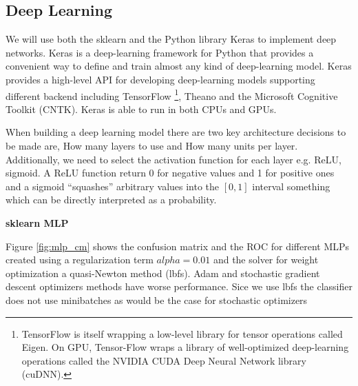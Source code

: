 \documentclass[11pt]{article}
\begin{document}


\subsection{Deep Learning}
\label{sse:resdeep}

We will use both the sklearn and the Python library Keras to implement deep networks. Keras is a deep-learning framework for Python that provides a convenient way to define and train almost any kind of deep-learning model. 
Keras provides a high-level API for developing deep-learning models supporting different backend including TensorFlow \footnote{TensorFlow is itself wrapping a low-level library for tensor operations called Eigen. On GPU, Tensor-Flow wraps a library of well-optimized deep-learning operations called the NVIDIA CUDA Deep Neural Network library (cuDNN).}, Theano and the Microsoft Cognitive Toolkit (CNTK). Keras is able to run in both CPUs and GPUs. 

When building a deep learning model there are two key architecture decisions to be made are, How many layers to use and How many units per layer. Additionally, we need to select the activation function for each layer e.g. ReLU, sigmoid. A ReLU function return 0 for negative values and 1 for positive ones and a sigmoid “squashes” arbitrary values into the $[0, 1]$ interval something which can be directly interpreted as a probability.

\textbf{sklearn MLP}

Figure \ref{fig:mlp_cm} shows the confusion matrix and the ROC for different MLPs created using a regularization term $alpha = 0.01$ and the solver for weight optimization a quasi-Newton method (lbfs). Adam and stochastic gradient descent optimizers methods have worse performance. Sice we use lbfs the classifier does not use minibatches as would be the case for stochastic optimizers
\end{document}
